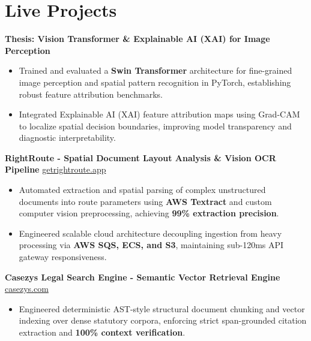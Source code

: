 \documentclass[9.5pt,a4paper]{article}
\begin{document}
\section*{Live Projects}
\noindent
\textbf{Thesis: Vision Transformer \& Explainable AI (XAI) for Image Perception}
\begin{itemize}
    \item Trained and evaluated a \textbf{Swin Transformer} architecture for fine-grained image perception and spatial pattern recognition in PyTorch, establishing robust feature attribution benchmarks.
    \item Integrated Explainable AI (XAI) feature attribution maps using Grad-CAM to localize spatial decision boundaries, improving model transparency and diagnostic interpretability.
\end{itemize}
\vspace{0.6pt}
\noindent
\textbf{RightRoute - Spatial Document Layout Analysis \& Vision OCR Pipeline} \hfill \href{https://getrightroute.app}{getrightroute.app}
\begin{itemize}
    \item Automated extraction and spatial parsing of complex unstructured documents into route parameters using \textbf{AWS Textract} and custom computer vision preprocessing, achieving \textbf{99\% extraction precision}.
    \item Engineered scalable cloud architecture decoupling ingestion from heavy processing via \textbf{AWS SQS, ECS, and S3}, maintaining sub-120ms API gateway responsiveness.
\end{itemize}
\vspace{0.6pt}
\noindent
\textbf{Casezys Legal Search Engine - Semantic Vector Retrieval Engine} \hfill \href{https://casezys.com}{casezys.com}
\begin{itemize}
    \item Engineered deterministic AST-style structural document chunking and vector indexing over dense statutory corpora, enforcing strict span-grounded citation extraction and \textbf{100\% context verification}.
\end{itemize}
\vspace{0.6pt}
\end{document}

